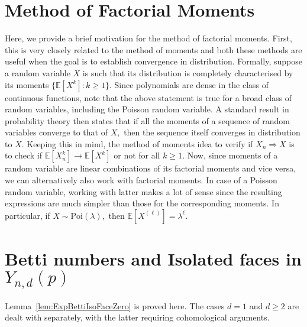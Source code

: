 \documentclass[12pt]{amsart}
\newcommand{\Exp}{\mathbb{E}}
\newcommand{\Poi}{\text{Poi}}
\newcommand{\gt}[1]{\textcolor{blue}{#1}}
\renewcommand{\gt}[1]{#1}
\numberwithin{equation}{section}
\numberwithin{theorem}{section}
\newcommand{\1}{\mathbf{1}}
\begin{document}
\section{Method of Factorial Moments}
\label{app:Method.Of.Factorial.Moments}
%
\gt{Here, we provide a brief motivation for the method of factorial moments. First, this is very closely related to the method of moments and both these methods are useful when the goal is to establish convergence in distribution. Formally, suppose a random variable $X$ is such that its distribution is completely characterised by its moments $\{\Exp[X^k]: k \geq 1\}.$ Since polynomials are dense in the class of continuous functions, note that the above statement is true for a  broad class of random variables, including the Poisson random variable. A standard result in probability theory then states that if all the moments of a sequence of random variables converge to that of $X,$ then the sequence itself converges in distribution to $X.$ Keeping this in mind, the method of moments idea to verify if $X_n \Rightarrow X$ is to check if $\Exp[X_n^k] \to \Exp[X^k]$ or not for all $k \geq 1.$ Now, since moments of a random variable are linear combinations of its factorial moments and vice versa, we can alternatively also work with factorial moments. In case of a Poisson random variable, working with latter makes a lot of sense since the resulting  expressions are much simpler than those for the corresponding moments. In particular, if $X \sim \Poi(\lambda),$ then $\Exp[X^{(\ell)}] = \lambda^\ell.$}


\section{Betti numbers and Isolated faces in $Y_{n, d}(p)$}
\label{app:cohomology}

Lemma~\ref{lem:ExpBettiIsoFaceZero} is proved here. The cases $d = 1$ and $d \geq 2$ are dealt with separately, with the latter requiring cohomological arguments.
\end{document}
